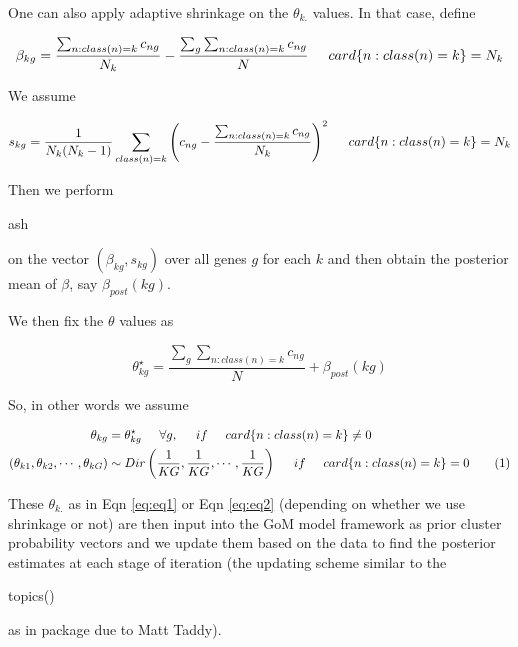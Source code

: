 \documentclass[12pt]{article}
\newcommand\numberthis{\addtocounter{equation}{1}\tag{\theequation}}
\begin{document}
\begin{itemize}
One can also apply adaptive shrinkage on the $\theta_{k.}$ values. In that case, define

\begin{equation}
\beta_{kg} = \frac{\sum_{n:class(n)=k} c_{ng}}{N_{k}} - \frac{\sum_{g} \sum_{n:class(n)=k} c_{ng}}{N} \hspace{0.5 cm}  card \{n: class(n)=k \}=N_{k}
\end{equation}

We assume

\begin{equation}
s_{kg} = \frac{1}{N_{k} (N_{k}-1)} \sum_{class(n)=k} \left (c_{ng} - \frac{\sum_{n:class(n)=k} c_{ng}}{N_{k}} \right )^{2} \hspace{0.5 cm} card \{n: class(n)=k \}=N_{k}
\end{equation}

Then we perform \begin{verb} ash \end{verb} on the vector $(\beta_{kg}, s_{kg})$ over all genes $g$ for each $k$ and then obtain the posterior mean of $\beta$, say $\beta_{post}(kg)$.

We then fix the $\theta$ values as 

\begin{equation}
\theta^{\star}_{kg} = \frac{\sum_{g} \sum_{n:class(n)=k} c_{ng}}{N} + \beta_{post}(kg)
\end{equation}

So, in other words we assume

\begin{align*}
\theta_{kg} & = \theta^{\star}_{kg} \hspace{0.5 cm} \forall g,  \hspace{0.5 cm} if \hspace{0.5 cm} card \{n: class(n)=k \} \neq 0 \nonumber \\
\left(\theta_{k1}, \theta_{k2}, \cdots, \theta_{kG} \right) & \sim Dir \left ( \frac{1}{KG}, \frac{1}{KG}, \cdots, \frac{1}{KG} \right) \hspace{0.5 cm} if \hspace{0.5 cm} card \{n: class(n)=k \}= 0 \numberthis \label{eq:eq2} \\
\end{align*}

These $\theta_{k.}$ as in Eqn \eqref{eq:eq1} or Eqn \eqref{eq:eq2} (depending on whether we use shrinkage or not) are then input into the GoM model framework as prior cluster probability vectors and we update them based on the data to find the posterior estimates at each stage of iteration (the updating scheme similar to the \begin{verb} topics() \end{verb} as in  package due to Matt Taddy).


\end{itemize}
\end{document}
